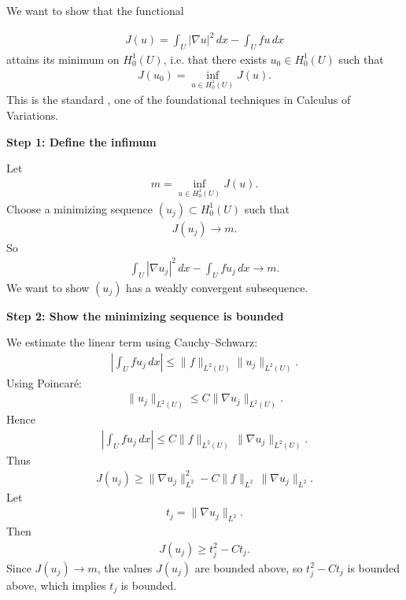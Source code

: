 \documentclass[12pt,a4paper]{report}
\begin{document}
\begin{description}
\HLINE


We want to show that the functional

\begin{align*}
J(u)=\int_U |\nabla u|^2\,dx-\int_U fu\,dx
\end{align*}
attains its minimum on $H_0^1(U)$, i.e. that there exists $u_0\in H_0^1(U)$ such that
\begin{align*}
J(u_0)=\inf_{u\in H_0^1(U)}J(u).
\end{align*}
This is the standard , one of the foundational techniques in Calculus of Variations.
\begin{description}

\item \textbf{Step 1: Define the infimum}

Let
\begin{align*}
m=\inf_{u\in H_0^1(U)}J(u).
\end{align*}
Choose a minimizing sequence $(u_j)\subset H_0^1(U)$ such that
\begin{align*}
J(u_j)\to m.
\end{align*}
So
\begin{align*}
\int_U |\nabla u_j|^2\,dx-\int_U fu_j\,dx\to m.
\end{align*}
We want to show $(u_j)$ has a weakly convergent subsequence.

\item \textbf{Step 2: Show the minimizing sequence is bounded}

We estimate the linear term using Cauchy–Schwarz:
\begin{align*}
\left|\int_U fu_j\,dx\right| \le \|f\|_{L^2(U)}\|u_j\|_{L^2(U)}.
\end{align*}
Using Poincaré:
\begin{align*}
\|u_j\|_{L^2(U)} \le C\|\nabla u_j\|_{L^2(U)}.
\end{align*}
Hence
\begin{align*}
\left|\int_U fu_j\,dx\right| \le C\|f\|_{L^2(U)}\,\|\nabla u_j\|_{L^2(U)}.
\end{align*}
Thus
\begin{align*}
J(u_j) \ge
\|\nabla u_j\|_{L^2}^2 - C\|f\|_{L^2}\,\|\nabla u_j\|_{L^2}.
\end{align*}
Let
\begin{align*}
t_j=\|\nabla u_j\|_{L^2}.
\end{align*}
Then
\begin{align*}
J(u_j)\ge t_j^2-Ct_j.
\end{align*}
Since $J(u_j)\to m$, the values $J(u_j)$ are bounded above, so $t_j^2-Ct_j$ is bounded above, which implies $t_j$ is bounded.


\end{description}
\end{description}
\end{document}
